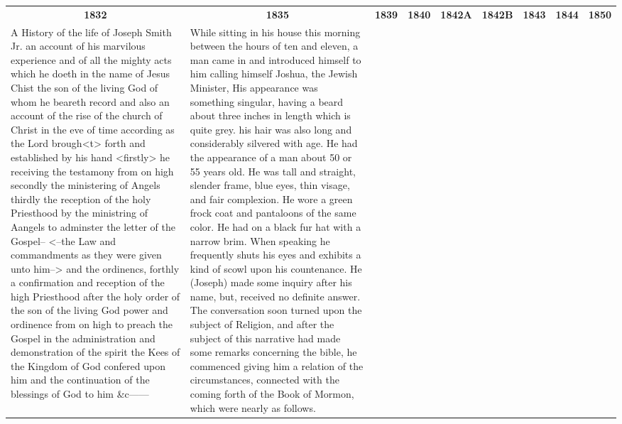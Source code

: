 			\begin{tabular}{p{1.7cm}|p{1.7cm}|p{1.7cm}|p{1.7cm}|p{1.7cm}|p{1.7cm}|p{1.7cm}|p{1.7cm}|p{1.7cm}}
				\multicolumn{1}{c}{\textbf{1832}} & \multicolumn{1}{c}{\textbf{1835}} & \multicolumn{1}{c}{\textbf{1839}} & \multicolumn{1}{c}{\textbf{1840}} & \multicolumn{1}{c}{\textbf{1842A}} & \multicolumn{1}{c}{\textbf{1842B}} & \multicolumn{1}{c}{\textbf{1843}} & \multicolumn{1}{c}{\textbf{1844}} & \multicolumn{1}{c}{\textbf{1850}} \\
				{\tiny A History of the life of Joseph Smith Jr. an account of his marvilous experience and of all the mighty acts which he doeth in the name of Jesus Chist the son of the living God of whom he beareth record and also an account of the rise of the church of Christ in the eve of time according as the Lord brough<t> forth and established by his hand <firstly> he receiving the testamony from on high secondly the ministering of Angels thirdly the reception of the holy Priesthood by the ministring of Aangels to adminster the letter of the Gospel-- <--the Law and commandments as they were given unto him--> and the ordinencs, forthly a confirmation and reception of the high Priesthood after the holy order of the son of the living God power and ordinence from on high to preach the Gospel in the administration and demonstration of the spirit the Kees of the Kingdom of God confered upon him and the continuation of the blessings of God to him \&c------
				
				\phantom{.}} &%
				{\tiny While sitting in his house this morning between the hours of ten and eleven, a man came in and introduced himself to him calling himself Joshua, the Jewish Minister, His appearance was something singular, having a beard about three inches in length which is quite grey. his hair was also long and considerably silvered with age. He had the appearance of a man about 50 or 55 years old. He was tall and straight, slender frame, blue eyes, thin visage, and fair complexion. He wore a green frock coat and pantaloons of the same color. He had on a black fur hat with a narrow brim. When speaking he frequently shuts his eyes and exhibits a kind of scowl upon his countenance. He (Joseph) made some inquiry after his name, but, received no definite answer. The conversation soon turned upon the subject of Religion, and after the subject of this narrative had made some remarks concerning the bible, he commenced giving him a relation of the circumstances, connected with the coming forth of the Book of Mormon, which were nearly as follows.
				
}
\end{tabular}

